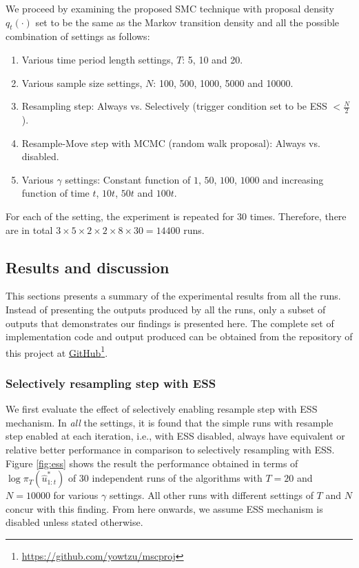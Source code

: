 We proceed by examining the proposed SMC technique with proposal density $q_t(\cdot)$ set to be the same as the Markov transition density and all the possible combination of settings as follows:
\begin{enumerate}
\item Various time period length settings, $T$: 5, 10 and 20.
\item Various sample size settings, $N$: 100, 500, 1000, 5000 and 10000.
\item Resampling step: Always vs. Selectively (trigger condition set to be ESS $< \frac{N}{2}$).
\item Resample-Move step with MCMC (random walk proposal): Always vs. disabled.
\item Various $\gamma$ settings: Constant function of $1$, $50$, $100$, $1000$ and increasing function of time $t$, $10t$, $50t$ and $100t$.
\end{enumerate}

For each of the setting, the experiment is repeated for $30$ times. Therefore, there are in total $3 \times 5 \times 2 \times 2 \times 8 \times 30 = 14400$ runs. 

\subsection{Results and discussion}
This sections presents a summary of the experimental results from all the runs. Instead of presenting the outputs produced by all the runs, only a subset of outputs that demonstrates our findings is presented here. The complete set of implementation code and output produced can be obtained from the repository of this project at \href{https://github.com/yowtzu/mscproj}{GitHub}\footnote{\href{https://github.com/yowtzu/mscproj}{https://github.com/yowtzu/mscproj}}.

\subsubsection{Selectively resampling step with ESS}
We first evaluate the effect of selectively enabling resample step with ESS mechanism. In \emph{all} the settings, it is found that the simple runs with resample step enabled at each iteration, i.e., with ESS disabled,  always have equivalent or relative better performance in comparison to selectively resampling with ESS. Figure \ref{fig:ess} shows the result the performance obtained in terms of $\log\pi_T(\hat{u}^*_{1:t})$ of 30 independent runs of the algorithms with $T=20$ and $N=10000$ for various $\gamma$ settings. All other runs with different settings of $T$ and $N$ concur with this finding. From here onwards, we assume ESS mechanism is disabled unless stated otherwise.

